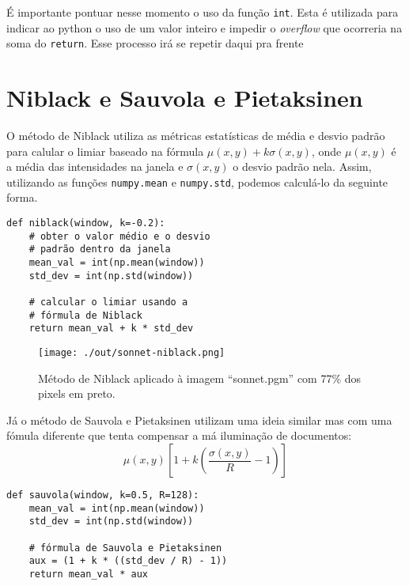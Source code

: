 \documentclass[twocolumn, 10pt]{article}
\begin{document}
É importante pontuar nesse momento o uso da função \texttt{int}.
Esta é utilizada para indicar ao python o uso de um valor inteiro e impedir o \emph{overflow} que ocorreria na soma do \texttt{return}.
Esse processo irá se repetir daqui pra frente

\section*{Niblack e Sauvola e Pietaksinen}
\label{sec:org208e72e}
O método de Niblack utiliza as métricas estatísticas de média e desvio padrão para calular o limiar baseado na fórmula \(\mu(x,y) + k \sigma(x,y)\), onde \(\mu(x,y)\) é a média das intensidades na janela e \(\sigma(x,y)\) o desvio padrão nela.
Assim, utilizando as funções \texttt{numpy.mean} e \texttt{numpy.std}, podemos calculá-lo da seguinte forma.
\begin{verbatim}
def niblack(window, k=-0.2):
    # obter o valor médio e o desvio
    # padrão dentro da janela
    mean_val = int(np.mean(window))
    std_dev = int(np.std(window))

    # calcular o limiar usando a
    # fórmula de Niblack
    return mean_val + k * std_dev
\end{verbatim}
\begin{figure}[htbp]
\centering
\texttt{[image: ./out/sonnet-niblack.png]}
\caption{Método de Niblack aplicado à imagem ``sonnet.pgm'' com 77\% dos pixels em preto.}
\end{figure}

Já o método de Sauvola e Pietaksinen utilizam uma ideia similar mas com uma fómula diferente que tenta compensar a má iluminação de documentos:
\[\mu(x, y)\left[1+k\left(\frac{\sigma(x, y)}{R}-1\right)\right] \]
\begin{verbatim}
def sauvola(window, k=0.5, R=128):
    mean_val = int(np.mean(window))
    std_dev = int(np.std(window))

    # fórmula de Sauvola e Pietaksinen
    aux = (1 + k * ((std_dev / R) - 1))
    return mean_val * aux
\end{verbatim}
\end{document}
